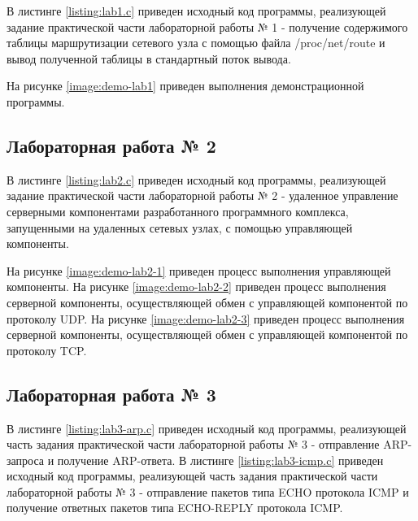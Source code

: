 	В листинге \ref{listing:lab1.c} приведен исходный код программы, реализующей задание практической части лабораторной работы № 1 - получение содержимого
	таблицы маршрутизации сетевого узла с помощью файла /proc/net/route и вывод полученной таблицы в стандартный поток вывода.

	На рисунке \ref{image:demo-lab1} приведен выполнения демонстрационной программы.


	\subsection{Лабораторная работа № 2}

	В листинге \ref{listing:lab2.c} приведен исходный код программы, реализующей задание практической части лабораторной работы № 2 - удаленное управление
	серверными компонентами разработанного программного комплекса, запущенными на удаленных сетевых узлах, с помощью управляющей компоненты.

	На рисунке \ref{image:demo-lab2-1} приведен процесс выполнения управляющей компоненты.
	На рисунке \ref{image:demo-lab2-2} приведен процесс выполнения серверной компоненты, осуществляющей обмен с	управляющей компонентой по протоколу UDP.
	На рисунке \ref{image:demo-lab2-3} приведен процесс выполнения серверной компоненты, осуществляющей обмен с	управляющей компонентой по протоколу TCP.


	\subsection{Лабораторная работа № 3}

	В листинге \ref{listing:lab3-arp.c} приведен исходный код программы, реализующей часть задания практической части лабораторной работы № 3 -
	отправление ARP-запроса и получение ARP-ответа. В листинге \ref{listing:lab3-icmp.c} приведен исходный код программы, реализующей часть
	задания практической части лабораторной работы № 3 - отправление пакетов типа ECHO протокола ICMP и получение ответных пакетов типа ECHO-REPLY
	протокола ICMP.

